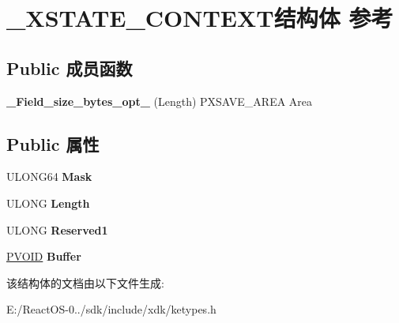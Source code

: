 \hypertarget{struct___x_s_t_a_t_e___c_o_n_t_e_x_t}{}\section{\+\_\+\+X\+S\+T\+A\+T\+E\+\_\+\+C\+O\+N\+T\+E\+X\+T结构体 参考}
\label{struct___x_s_t_a_t_e___c_o_n_t_e_x_t}
\subsection*{Public 成员函数}
\begin{DoxyCompactItemize}
\item 
\mbox{\label{struct___x_s_t_a_t_e___c_o_n_t_e_x_t_a292697ccf10766b4ed74c3fa421c38a5}} 
{\bfseries \+\_\+\+Field\+\_\+size\+\_\+bytes\+\_\+opt\+\_\+} (Length) P\+X\+S\+A\+V\+E\+\_\+\+A\+R\+EA Area
\end{DoxyCompactItemize}
\subsection*{Public 属性}
\begin{DoxyCompactItemize}
\item 
\mbox{\label{struct___x_s_t_a_t_e___c_o_n_t_e_x_t_a98f94d27c8320c90c21132ad684b135d}} 
U\+L\+O\+N\+G64 {\bfseries Mask}
\item 
\mbox{\label{struct___x_s_t_a_t_e___c_o_n_t_e_x_t_a24d76482faecc88b03f18a0798514380}} 
U\+L\+O\+NG {\bfseries Length}
\item 
\mbox{\label{struct___x_s_t_a_t_e___c_o_n_t_e_x_t_a933bc344ad4e15233c5d1252196fd47a}} 
U\+L\+O\+NG {\bfseries Reserved1}
\item 
\mbox{\label{struct___x_s_t_a_t_e___c_o_n_t_e_x_t_a7654be2e203373202709d997f8dfb1cb}} 
\hyperlink{interfacevoid}{P\+V\+O\+ID} {\bfseries Buffer}
\end{DoxyCompactItemize}


该结构体的文档由以下文件生成\+:\begin{DoxyCompactItemize}
\item 
E\+:/\+React\+O\+S-\/0../sdk/include/xdk/ketypes.\+h\end{DoxyCompactItemize}
